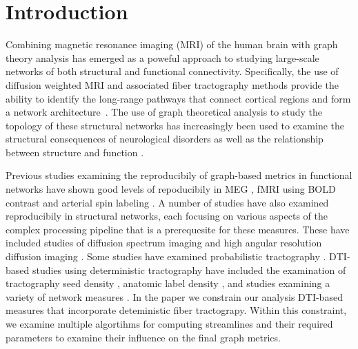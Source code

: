 \documentclass{frontiersSCNS} %
\begin{document}
\section{Introduction}
Combining magnetic resonance imaging (MRI) of the human brain with graph
theory analysis has emerged as a poweful approach to studying
large-scale networks of both structural and functional
connectivity. Specifically, the use of diffusion weighted MRI and
associated fiber tractography methods provide the ability to identify
the long-range pathways that connect cortical regions and form a
network architecture~\citep{Basser2000,Lazar2003,Hagmann2003,Xue1999}. 
The use of graph theoretical analysis to study
the topology of these structural networks has increasingly been used to
examine the structural consequences of neurological disorders \citep{Xie2012}
as well as the relationship between structure and function \citep{}. 

Previous studies examining the reproducibily of graph-based metrics in
functional networks have shown good levels of repoducibily in MEG
\citep{Deuker2009}, fMRI using BOLD contrast
\citep{Telesford2010,Braun2012,Schwarz2011,Liang2012,Weber2013} and
arterial spin labeling \citep{Weber2013}. A number of studies have also examined
reproducibily in structural networks, each focusing on various aspects
of the complex processing pipeline that is a prerequesite for these
measures. These have included studies of diffusion spectrum imaging
\citep{Cammoun2012,Bassett2011N} and high angular resolution diffusion
imaging \citep{Dennis2012}. Some studies have examined probabilistic
tractography \citep{Owen2013BC,Vaessen2010}. DTI-based studies using
deterministic tractography have included the examination of
tractography seed density \citep{Cheng2012N}, anatomic label density
\citep{Bassett2011N}, and studies examining a variety of network
measures \citep{Cheng2012N,Irimia2012N}. In the paper we constrain our
analysis DTI-based measures that incorporate deteministic fiber
tractograpy. Within this constraint, we examine multiple algortihms
for computing streamlines and their required parameters to examine
their influence on the final graph metrics. 
\end{document}
